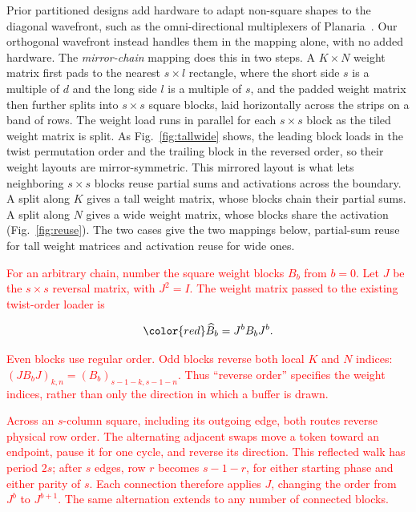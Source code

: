 Prior partitioned designs add hardware to adapt non-square shapes to
the diagonal wavefront, such as the omni-directional multiplexers of
Planaria~\cite{ghodrati2020planaria}. Our orthogonal wavefront instead
handles them in the mapping alone, with no added hardware.
The \emph{mirror-chain} mapping does this in two steps. A $K{\times}N$ weight matrix first pads
to the nearest $s{\times}l$ rectangle, where the short side $s$ is
a multiple of $d$ and the long side $l$ is a multiple of $s$, and
the padded weight matrix then further splits into $s{\times}s$ square blocks, laid horizontally
across the strips on a band of rows. The weight load runs in parallel
for each $s{\times}s$ block as the tiled weight matrix is split. As
Fig.~\ref{fig:tallwide} shows, the leading block loads in the twist
permutation order and the trailing block in the reversed order, so
their weight layouts are mirror-symmetric. This mirrored layout is what
lets neighboring $s{\times}s$ blocks reuse partial sums and activations
across the boundary. A split along $K$ gives a tall weight matrix,
whose blocks chain their partial sums. A split along $N$ gives a
wide weight matrix, whose blocks share the activation
(Fig.~\ref{fig:reuse}). The two cases give
the two mappings below, partial-sum reuse for tall weight matrices and
activation reuse for wide ones.

\begingroup
\textcolor{red}{For an arbitrary chain, number the square weight blocks $B_b$ from
$b=0$. Let $J$ be the $s\times s$ reversal matrix, with $J^2=I$.
The weight matrix passed to the existing twist-order loader is}

\begin{equation}
\color{red}
 \widehat B_b=J^b B_b J^b.
 \label{eq:full-mirror}
\end{equation}

\textcolor{red}{Even blocks use regular order. Odd blocks reverse both local $K$ and
$N$ indices: $(JB_bJ)_{k,n}=(B_b)_{s-1-k,s-1-n}$.
Thus ``reverse order'' specifies the weight indices, rather than
only the direction in which a buffer is drawn.}

\textcolor{red}{Across an $s$-column square, including its outgoing edge, both routes
reverse physical row order. The alternating adjacent swaps move a
token toward an endpoint, pause it for one cycle, and reverse its
direction. This reflected walk has period $2s$; after $s$ edges,
row $r$ becomes $s-1-r$, for either starting phase and either parity
of $s$. Each connection therefore applies $J$, changing the order
from $J^b$ to $J^{b+1}$. The same alternation extends to any number
of connected blocks.}
\par
\endgroup

